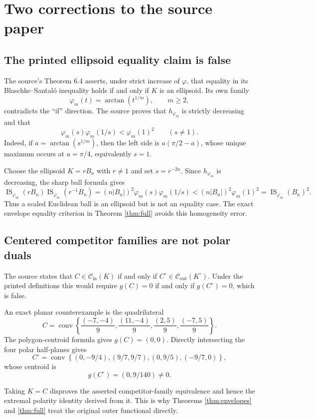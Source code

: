 \documentclass[11pt]{article}
\newcommand{\IS}{\operatorname{IS}}
\newcommand{\Cin}{\mathcal C_{\mathrm{in}}}
\newcommand{\Cout}{\mathcal C_{\mathrm{out}}}
\begin{document}
\section{Two corrections to the source paper}

\subsection{The printed ellipsoid equality claim is false}

The source's Theorem 6.4 asserts, under strict increase of $\varphi$, that
equality in its Blaschke--Santal\'o inequality holds if and only if $K$ is an
ellipsoid.  Its own family
\[
 \varphi_m(t)=\arctan(t^{1/m}),\qquad m\geq2,
\]
contradicts the ``if'' direction.  The source proves that $h_{\varphi_m}$ is
strictly decreasing and that
\begin{equation}\label{eq:atanstrict}
 \varphi_m(s)\varphi_m(1/s)<\varphi_m(1)^2
 \qquad(s\neq1).
\end{equation}
Indeed, if $a=\arctan(s^{1/m})$, then the left side is
$a(\pi/2-a)$, whose unique maximum occurs at $a=\pi/4$, equivalently $s=1$.

Choose the ellipsoid $K=rB_n$ with $r\neq1$ and set $s=r^{-2n}$.  Since
$h_{\varphi_m}$ is decreasing, the sharp ball formula gives
\[
 \IS_{\varphi_m}(rB_n)\IS_{\varphi_m}(r^{-1}B_n)
 =(n|B_n|)^2\varphi_m(s)\varphi_m(1/s)
 <(n|B_n|)^2\varphi_m(1)^2
 =\IS_{\varphi_m}(B_n)^2.
\]
Thus a scaled Euclidean ball is an ellipsoid but is not an equality case.
The exact envelope equality criterion in Theorem \ref{thm:full} avoids this
homogeneity error.

\subsection{Centered competitor families are not polar duals}

The source states that $C\in\Cin(K)$ if and only if
$C^\circ\in\Cout(K^\circ)$.  Under the printed definitions this would require
$g(C)=0$ if and only if $g(C^\circ)=0$, which is false.

An exact planar counterexample is the quadrilateral
\[
 C=\operatorname{conv}\left\{
 \frac{(-7,-4)}9,\frac{(11,-4)}9,
 \frac{(2,5)}9,\frac{(-7,5)}9\right\}.
\]
The polygon-centroid formula gives $g(C)=(0,0)$.  Directly intersecting the
four polar half-planes gives
\[
 C^\circ=\operatorname{conv}\left\{
 (0,-9/4),(9/7,9/7),(0,9/5),(-9/7,0)\right\},
\]
whose centroid is
\[
 g(C^\circ)=(0,9/140)\neq0.
\]
\par\noindent
Taking $K=C$ disproves the asserted competitor-family equivalence and hence
the extremal polarity identity derived from it.  This is why Theorems
\ref{thm:envelopes} and \ref{thm:full} treat the original outer functional
directly.
\end{document}
